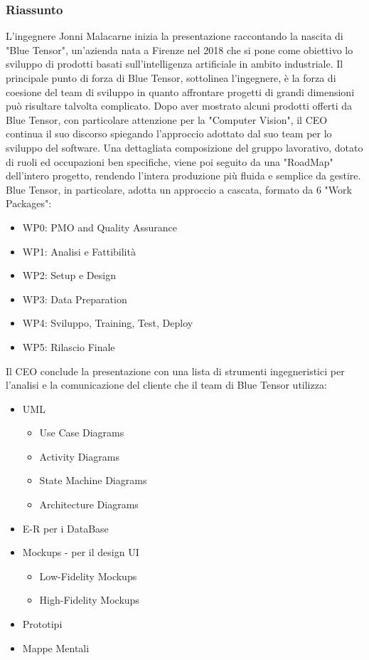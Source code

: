 \documentclass{report}
\begin{document}
\subsubsection*{Riassunto}
L'ingegnere Jonni Malacarne inizia la presentazione raccontando la nascita di "Blue Tensor", un'azienda nata a Firenze nel 2018 che si pone come obiettivo lo sviluppo di prodotti basati sull'intelligenza artificiale in ambito industriale. Il principale punto di forza di Blue Tensor, sottolinea l'ingegnere, è la forza di coesione del team di sviluppo in quanto affrontare progetti di grandi dimensioni può risultare talvolta complicato.
Dopo aver mostrato alcuni prodotti offerti da Blue Tensor, con particolare attenzione per la "Computer Vision", il CEO continua il suo discorso spiegando l'approccio adottato dal suo team per lo sviluppo del software. Una dettagliata composizione del gruppo lavorativo, dotato di ruoli ed occupazioni ben specifiche, viene poi seguito da una "RoadMap" dell'intero progetto, rendendo l'intera produzione più fluida e semplice da gestire. Blue Tensor, in particolare, adotta un approccio a cascata, formato da 6 "Work Packages":
\begin{itemize}
	\item WP0: PMO and Quality Assurance
	\item WP1: Analisi e Fattibilità
	\item WP2: Setup e Design
	\item WP3: Data Preparation
	\item WP4: Sviluppo, Training, Test, Deploy
	\item WP5: Rilascio Finale
\end{itemize}
Il CEO conclude la presentazione con una lista di strumenti ingegneristici per l'analisi e la comunicazione del cliente che il team di Blue Tensor utilizza:
\begin{itemize}
	\item UML
	\begin{itemize}
		\item Use Case Diagrams
		\item Activity Diagrams
		\item State Machine Diagrams
		\item Architecture Diagrams
	\end{itemize}
	\item E-R per i DataBase
	\item Mockups - per il design UI 
	\begin{itemize}
		\item Low-Fidelity Mockups
		\item High-Fidelity Mockups
	\end{itemize}
	\item Prototipi
	\item Mappe Mentali
\end{itemize}
\end{document}
